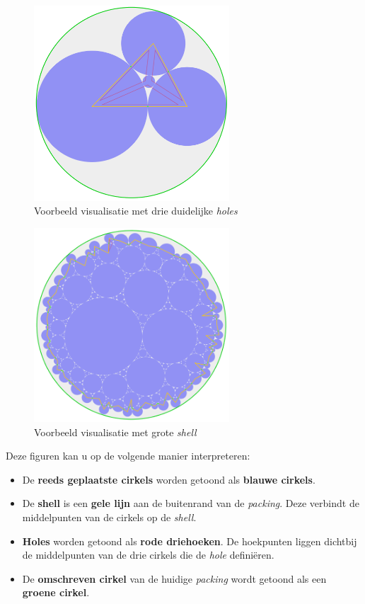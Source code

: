 \documentclass[12pt,a4paper,oneside]{book}
\begin{document}
\begin{figure}
  \centering
  \includegraphics[width=0.65\textwidth]{handleiding-visualisatie-1.png}
  \caption{Voorbeeld visualisatie met drie duidelijke \textit{holes}} \label{fig:handleiding-visualisatie-1}
\end{figure}

\begin{figure}
  \centering
  \includegraphics[width=0.65\textwidth]{handleiding-visualisatie-2.png}
  \caption{Voorbeeld visualisatie met grote \textit{shell}} \label{fig:handleiding-visualisatie-2}
\end{figure}

Deze figuren kan u op de volgende manier interpreteren:

\begin{itemize}  
	\item De \textbf{reeds geplaatste cirkels} worden getoond als \textbf{blauwe cirkels}.
	\item De \textbf{shell} is een \textbf{gele lijn} aan de buitenrand van de \textit{packing}. Deze verbindt de middelpunten van de cirkels op de \textit{shell}.
	\item \textbf{Holes} worden getoond als \textbf{rode driehoeken}. De hoekpunten liggen dichtbij de middelpunten van de drie cirkels die de \textit{hole} definiëren.
	\item De \textbf{omschreven cirkel} van de huidige \textit{packing} wordt getoond als een \textbf{groene cirkel}.
\end{itemize}
\end{document}
